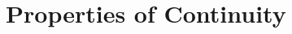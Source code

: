 \newpage

\section[Day 15: Continuity Properties]{Properties of Continuity}


























